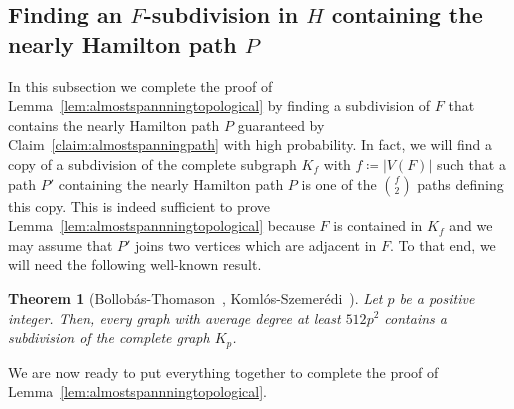 \documentclass[10pt]{article}
\theoremstyle{plain}
\newtheorem{theorem}{Theorem}
\numberwithin{theorem}{section}
\theoremstyle{definition}
\theoremstyle{remark}
\theoremstyle{plain}
\begin{document}
\subsection{Finding an \texorpdfstring{$F$}{F}-subdivision in \texorpdfstring{$H$}{H} containing the nearly Hamilton path \texorpdfstring{$P$}{P}}
\label{sec:findingFsubdivisioncontainingP}
	In this subsection we complete the proof of Lemma~\ref{lem:almostspannningtopological} by finding a subdivision of $F$ that contains the nearly Hamilton path $P$ guaranteed by Claim~\ref{claim:almostspanningpath} with high probability. In fact, we will find a copy of a subdivision of the complete subgraph $K_f$ with $f \coloneqq |V(F)|$ such that a path $P'$ containing the nearly Hamilton path $P$ is one of the $\binom{f}{2}$ paths defining this copy. This is indeed sufficient to prove Lemma~\ref{lem:almostspannningtopological} because $F$ is contained in $K_f$ and we may assume that $P'$ joins two vertices which are adjacent in $F$. To that end, we will need the following well-known result.

	\begin{theorem}[Bollob\'as-Thomason~\cite{bollobas1998proof}, Koml\'os-Szemer\'edi~\cite{komlos1996topological}]
		\label{thm:BT}
		Let $p$ be a positive integer. Then, every graph with average degree at least $512 p^2$ contains a subdivision of the complete graph $K_p$. 
	\end{theorem}

	We are now ready to put everything together to complete the proof of Lemma~\ref{lem:almostspannningtopological}. 
\end{document}
